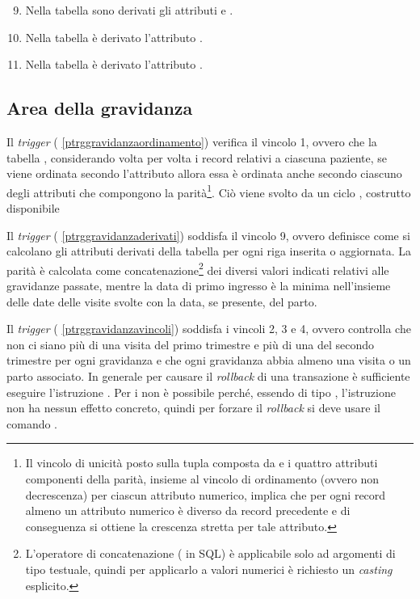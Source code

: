 \begin{enumerate}
\setcounter{enumi}{8}
\item Nella tabella  sono derivati gli attributi  e .
\item Nella tabella  è derivato l'attributo .
\item Nella tabella  è derivato l'attributo .
\end{enumerate}

\subsection{Area della gravidanza}
\label{triggerspregnancy}

Il \emph{trigger}  (\lstlistingname{} \ref{ptrggravidanzaordinamento}) verifica il vincolo 1, ovvero che la tabella , considerando volta per volta i record relativi a ciascuna paziente, se viene ordinata secondo l'attributo  allora essa è ordinata anche secondo ciascuno degli attributi che compongono la parità\footnote{
  Il vincolo di unicità posto sulla tupla composta da  e i quattro attributi componenti della parità, insieme al vincolo di ordinamento (ovvero non decrescenza) per ciascun attributo numerico, implica che per ogni record almeno un attributo numerico è diverso da record precedente e di conseguenza si ottiene la crescenza stretta per tale attributo.
}.
Ciò viene svolto da un ciclo , costrutto disponibile 

Il \emph{trigger}  (\lstlistingname{} \ref{ptrggravidanzaderivati}) soddisfa il vincolo 9, ovvero definisce come si calcolano gli attributi derivati della tabella  per ogni riga inserita o aggiornata.
La parità è calcolata come concatenazione\footnote{
  L'operatore di concatenazione (\sql{||} in SQL) è applicabile solo ad argomenti di tipo testuale, quindi per applicarlo a valori numerici è richiesto un \emph{casting} esplicito.
} dei diversi valori indicati relativi alle gravidanze passate, mentre la data di primo ingresso è la minima nell'insieme delle date delle visite svolte con la data, se presente, del parto.

Il \emph{trigger}  (\lstlistingname{} \ref{ptrggravidanzavincoli}) soddisfa i vincoli 2, 3 e 4, ovvero controlla che non ci siano più di una visita del primo trimestre e più di una del secondo trimestre per ogni gravidanza e che ogni gravidanza abbia almeno una visita o un parto associato.
In generale per causare il \emph{rollback} di una transazione è sufficiente eseguire l'istruzione .
Per i  non è possibile perché, essendo di tipo , l'istruzione  non ha nessun effetto concreto, quindi per forzare il \emph{rollback} si deve usare il comando .

